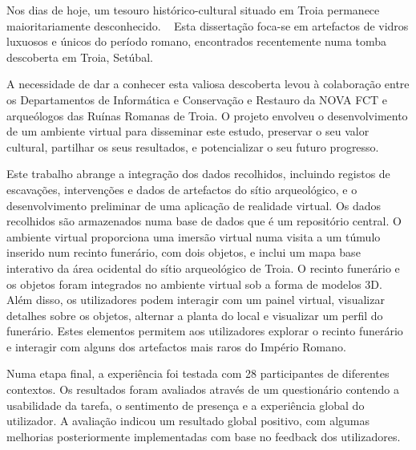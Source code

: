 
%


Nos dias de hoje, um tesouro histórico-cultural situado em Troia permanece maioritariamente desconhecido.  
Esta dissertação foca-se em artefactos de vidros luxuosos e únicos do período romano, encontrados recentemente numa tomba descoberta em Troia, Setúbal.

A necessidade de dar a conhecer esta valiosa descoberta levou à colaboração entre os Departamentos de Informática e Conservação e Restauro da NOVA FCT e arqueólogos das Ruínas Romanas de Troia. O projeto envolveu o desenvolvimento de um ambiente virtual para disseminar este estudo, preservar o seu valor cultural, partilhar os seus resultados, e potencializar o seu futuro progresso.

Este trabalho abrange a integração dos dados recolhidos, incluindo registos de escavações, intervenções e dados de artefactos do sítio arqueológico, e o desenvolvimento preliminar de uma aplicação de realidade virtual. Os dados recolhidos são armazenados numa base de dados que é um repositório central. O ambiente virtual proporciona uma imersão virtual numa visita a um túmulo inserido num recinto funerário, com dois objetos, e inclui um mapa base interativo da área ocidental do sítio arqueológico de Troia. O recinto funerário e os objetos foram integrados no ambiente virtual sob a forma de modelos 3D. Além disso, os utilizadores podem interagir com um painel virtual, visualizar detalhes sobre os objetos, alternar a planta do local e visualizar um perfil do funerário. Estes elementos permitem aos utilizadores explorar o recinto funerário e interagir com alguns dos artefactos mais raros do Império Romano.

Numa etapa final, a experiência foi testada com 28 participantes de diferentes contextos. Os resultados foram avaliados através de um questionário contendo a usabilidade da tarefa, o sentimento de presença e a experiência global do utilizador. A avaliação indicou um resultado global positivo, com algumas melhorias posteriormente implementadas com base no feedback dos utilizadores.


